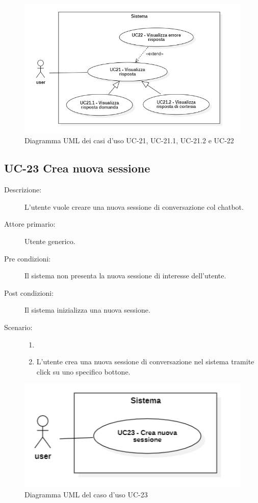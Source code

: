 \begin{figure}[H]
    \centering
    \includegraphics[width=0.77\linewidth]{UC21-22.PNG} 
    \caption{Diagramma UML dei casi d'uso UC-21, UC-21.1, UC-21.2 e UC-22}
    \label{fig:UC21-22}
\end{figure}

\subsection{UC-23 Crea nuova sessione}
\begin{description}
    \item[Descrizione:] L'utente vuole creare una nuova sessione di conversazione col chatbot.
    \item[Attore primario:] Utente generico.
    \item[Pre condizioni:] Il sistema non presenta la nuova sessione di interesse dell'utente.
    \item[Post condizioni:] Il sistema inizializza una nuova sessione.
    \item[Scenario:] 
    \begin{enumerate}
        \item[]
        \item L'utente crea una nuova sessione di conversazione nel sistema tramite click su uno specifico bottone. %
    \end{enumerate}
\end{description}

\begin{figure}[H]
    \centering
    \includegraphics[width=0.8\linewidth]{UC23.PNG} 
    \caption{Diagramma UML del caso d'uso UC-23}
    \label{fig:UC23}
\end{figure}


